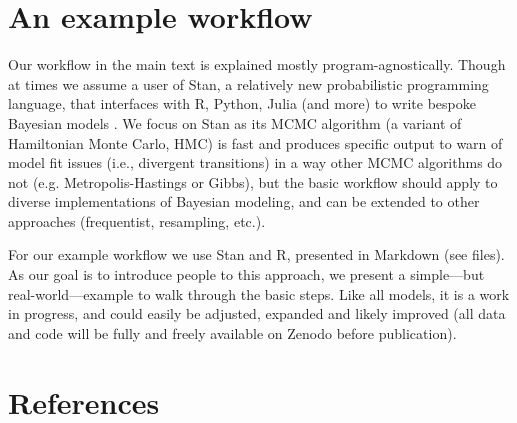 \documentclass[11pt]{article}
\begin{document}


\section*{An example workflow}

Our workflow in the main text is explained mostly program-agnostically. Though at times we assume a user of \textsf{Stan}, a relatively new probabilistic programming language, that interfaces with \textsf{R, Python, Julia} (and more) to write bespoke Bayesian models \citep{Carpenter:2017stan}. We focus on \textsf{Stan} as its MCMC algorithm (a variant of Hamiltonian Monte Carlo, HMC) is fast and produces specific output to warn of model fit issues (i.e., divergent transitions) in a way other MCMC algorithms do not (e.g. Metropolis-Hastings or Gibbs), but the basic workflow should apply to diverse implementations of Bayesian modeling, and can be extended to other approaches (frequentist, resampling, etc.). 

For our example workflow we use \textsf{Stan} and \textsf{R}, presented in Markdown (see files). As our goal is to introduce people to this approach, we present a simple---but real-world---example to walk through the basic steps. Like all models, it is a work in progress, and could easily be adjusted, expanded and likely improved (all data and code will be fully and freely available on Zenodo before publication).

\section*{References}
\vspace{-5ex}

\end{document}
